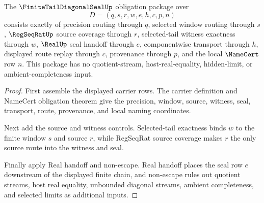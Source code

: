 \begin{theorem}
\label{thm:finite-tail-diagonal-seal-obligation-package}
The $\FiniteTailDiagonalSealUp$ obligation package over
$$
D=(q,s,r,w,e,h,c,p,n)
$$
consists exactly of precision routing through $q$, selected window routing through $s$, $\RegSeqRatUp$ source coverage through $r$, selected-tail witness exactness through $w$, $\RealUp$ seal handoff through $e$, componentwise transport through $h$, displayed route replay through $c$, provenance through $p$, and the local $\NameCert$ row $n$. This package has no quotient-stream, host-real-equality, hidden-limit, or ambient-completeness input.
\end{theorem}
\begin{proof}
First assemble the displayed carrier rows. The carrier definition and NameCert obligation theorem give the precision, window, source, witness, seal, transport, route, provenance, and local naming coordinates.

Next add the source and witness controls. Selected-tail exactness binds $w$ to the finite window $s$ and source $r$, while RegSeqRat source coverage makes $r$ the only source route into the witness and seal.

Finally apply Real handoff and non-escape. Real handoff places the seal row $e$ downstream of the displayed finite chain, and non-escape rules out quotient streams, host real equality, unbounded diagonal streams, ambient completeness, and selected limits as additional inputs.
\end{proof}

